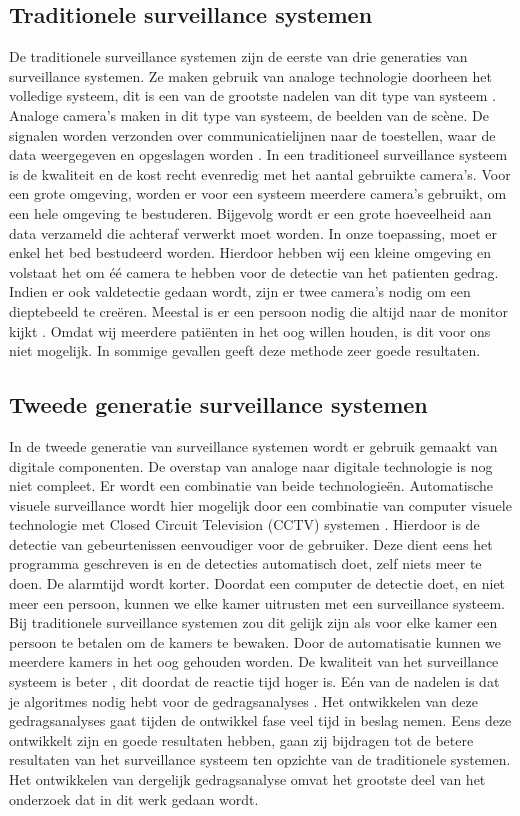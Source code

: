 \subsection{Traditionele surveillance systemen}
\label{refTST}
De traditionele surveillance systemen zijn de eerste van drie generaties van surveillance systemen. Ze maken gebruik van analoge technologie doorheen het volledige systeem, dit is een van de grootste nadelen van dit type van systeem \cite{bibIPC2}.  Analoge camera's maken in dit type van systeem, de beelden van de sc\`ene. De signalen worden verzonden over communicatielijnen naar de  toestellen, waar de data weergegeven en opgeslagen worden \cite{bibVTC2}. In een traditioneel surveillance systeem is de kwaliteit en de kost recht evenredig met het aantal gebruikte camera's. Voor een grote omgeving, worden er voor een systeem meerdere camera's gebruikt, om een hele omgeving te bestuderen. Bijgevolg wordt er een grote hoeveelheid aan data verzameld die achteraf verwerkt moet worden.  In onze toepassing, moet er enkel het bed bestudeerd worden. Hierdoor hebben wij een kleine omgeving en volstaat het om \'e\'e camera te hebben voor de detectie van het patienten gedrag. Indien er ook valdetectie gedaan wordt, zijn er  twee camera's nodig om een dieptebeeld te cre\"eren. Meestal is er een persoon nodig die altijd naar de monitor kijkt \cite{bibVTC}. Omdat wij meerdere pati\"enten in het oog willen houden, is dit voor ons niet mogelijk. In sommige gevallen geeft deze methode zeer goede resultaten.

\subsection{Tweede generatie surveillance systemen}
\label{refTGS}
In de tweede generatie van surveillance systemen wordt er gebruik gemaakt van digitale componenten. De overstap van analoge naar digitale technologie is nog niet compleet. Er wordt een combinatie van beide technologie\"en. Automatische visuele surveillance wordt hier mogelijk door een combinatie van computer visuele technologie met Closed Circuit Television (CCTV) systemen \cite{bibIPC2}. Hierdoor is de detectie van gebeurtenissen eenvoudiger voor de gebruiker. Deze dient eens het programma geschreven is en de detecties automatisch doet, zelf niets meer te doen. De alarmtijd wordt korter. Doordat een computer de detectie doet, en niet meer een persoon, kunnen we elke kamer uitrusten met een surveillance systeem. Bij traditionele surveillance systemen zou dit gelijk zijn als voor elke kamer een persoon te betalen om de kamers te bewaken. Door de automatisatie kunnen  we meerdere kamers in het oog gehouden worden. De kwaliteit van het surveillance systeem is beter \cite{bibVTC2}, dit doordat de reactie tijd hoger is. E\'en van de nadelen is dat je algoritmes nodig hebt voor de gedragsanalyses \cite{bibIPC2}. Het ontwikkelen van deze gedragsanalyses gaat tijden de ontwikkel fase veel tijd in beslag nemen. Eens deze ontwikkelt zijn en goede resultaten hebben, gaan zij bijdragen tot de betere resultaten van het surveillance systeem ten opzichte van de traditionele systemen. Het ontwikkelen van dergelijk gedragsanalyse omvat het grootste deel van het onderzoek dat in dit werk gedaan wordt. 

